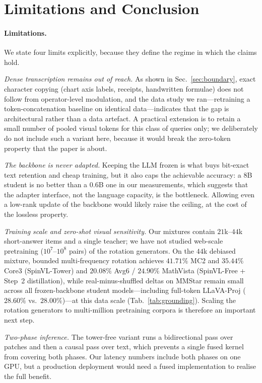 \documentclass[10pt,twocolumn,letterpaper]{article}
\newcommand{\modelname}{SpinVL}
\begin{document}
\section{Limitations and Conclusion}
\label{sec:conclusion}

\paragraph{Limitations.}
We state four limits explicitly, because they define the regime in which the
claims hold.

\emph{Dense transcription remains out of reach.} As shown in
Sec.~\ref{sec:boundary}, exact character copying (chart axis labels, receipts,
handwritten formulae) does not follow from operator-level modulation, and the
data study we ran---retraining a token-concatenation baseline on identical
data---indicates that the gap is architectural rather than a data artefact. A
practical extension is to retain a small number of pooled visual tokens for
this class of queries only; we deliberately do not include such a variant here,
because it would break the zero-token property that the paper is about.

\emph{The backbone is never adapted.} Keeping the LLM frozen is what buys
bit-exact text retention and cheap training, but it also caps the achievable
accuracy: a $8$B student is no better than a $0.6$B one in our measurements,
which suggests that the adapter interface, not the language capacity, is the
bottleneck. Allowing even a low-rank update of the backbone would likely raise
the ceiling, at the cost of the lossless property.

\emph{Training scale and zero-shot visual sensitivity.} Our mixtures contain
$21$k--$44$k short-answer items and a single teacher; we have not studied
web-scale pretraining ($10^7$--$10^8$ pairs) of the rotation generators. On the
$44$k debiased mixture, bounded multi-frequency rotation achieves $41.71\%$ MC2
and $35.44\%$ Core3 (\modelname-Tower) and $20.08\%$ Avg6 / $24.90\%$ MathVista
(\modelname-Free + Step~2 distillation), while real-minus-shuffled deltas on
MMStar remain small across all frozen-backbone student models---including
full-token LLaVA-Proj ($28.60\%$ vs.\ $28.00\%$)---at this data scale
(Tab.~\ref{tab:grounding}). Scaling the rotation generators to multi-million
pretraining corpora is therefore an important next step.

\emph{Two-phase inference.} The tower-free variant runs a bidirectional pass
over patches and then a causal pass over text, which prevents a single fused
kernel from covering both phases. Our latency numbers include both phases on
one GPU, but a production deployment would need a fused implementation to
realise the full benefit.
\end{document}
